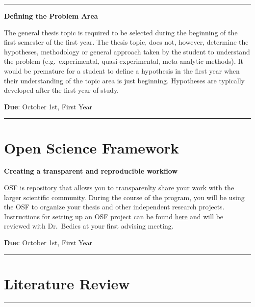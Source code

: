 \documentclass[openany]{book}
\begin{document}
\begin{center}\rule{0.5\linewidth}{0.5pt}\end{center}

\textbf{Defining the Problem Area}

The general thesis topic is required to be selected during the beginning of the first semester of the first year. The thesis topic, does not, however, determine the hypotheses, methodology or general approach taken by the student to understand the problem (e.g.~experimental, quasi-experimental, meta-analytic methods). It would be premature for a student to define a hypothesis in the first year when their understanding of the topic area is just beginning. Hypotheses are typically developed after the first year of study.

\textbf{Due}: October 1st, First Year

\begin{center}\rule{0.5\linewidth}{0.5pt}\end{center}

\hypertarget{open-science-framework}{%
\section{Open Science Framework}\label{open-science-framework}}

\textbf{Creating a transparent and reproducible workflow}

\href{https://osf.io/}{OSF} is repository that allows you to transparenlty share your work with the larger scientific community. During the course of the program, you will be using the OSF to organize your thesis and other independent research projects. Instructions for setting up an OSF project can be found \href{https://speakerdeck.com/jdbedics/osf-setup-and-class-project-introduction}{here} and will be reviewed with Dr.~Bedics at your first advising meeting.

\textbf{Due}: October 1st, First Year

\begin{center}\rule{0.5\linewidth}{0.5pt}\end{center}

\hypertarget{literature-review}{%
\section{Literature Review}\label{literature-review}}

\begin{center}\rule{0.5\linewidth}{0.5pt}\end{center}
\end{document}
